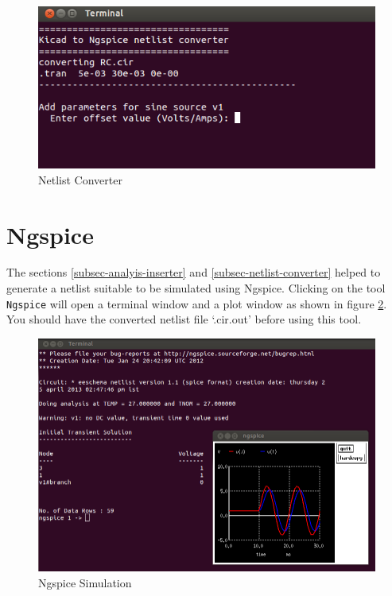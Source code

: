 \begin{figure}
\begin{center}
\includegraphics[width=0.8\linewidth]{figures/netlist-converter.png}
\caption{Netlist Converter}
\label{netlist-converter}
\end{center}
\end{figure}

\section{Ngspice}
The sections \ref{subsec-analyis-inserter} and \ref{subsec-netlist-converter} helped to generate a netlist suitable to be simulated using Ngspice. Clicking on the tool {\tt Ngspice} will open a terminal window and a plot window as shown in figure \ref{Ngspice-simulation}. You should have the converted netlist file `.cir.out' before using this tool.


\begin{figure}
\begin{center}
\includegraphics[width=0.8\linewidth]{figures/ngspice-simulation.png}
\caption{Ngspice Simulation}
\label{Ngspice-simulation}
\end{center}
\end{figure}

